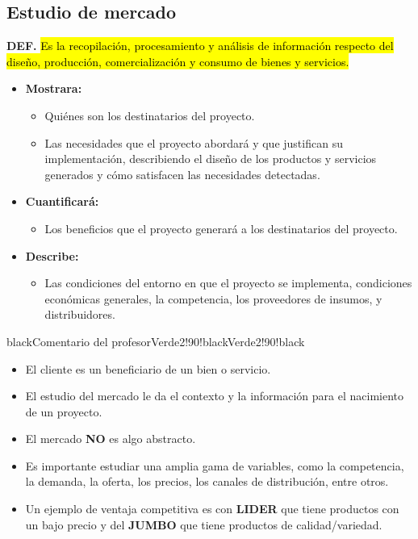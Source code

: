 \documentclass{templateNote}
\newcommand{\hlcolor}[2]{{\sethlcolor{#1}\hl{#2}}}
\begin{document}
\subsection{Estudio de mercado}\hypertarget{EM}{}
\textbf{DEF.} \hlcolor{Amarillo!50}{Es la recopilación, procesamiento y análisis de información respecto del diseño, producción, comercialización y consumo de bienes y servicios.}
\begin{itemize}
  \item \textbf{Mostrara:}
  \begin{itemize}
    \item Quiénes son los destinatarios del proyecto.
    \item Las necesidades que el proyecto abordará y que justifican su implementación, describiendo el diseño de los productos y servicios generados y cómo satisfacen las necesidades detectadas.
  \end{itemize}
  \item  \textbf{Cuantificará:}
  \begin{itemize}
    \item Los beneficios que el proyecto generará a los destinatarios del proyecto.
  \end{itemize}
  \item \textbf{Describe:}
  \begin{itemize}
    \item Las condiciones del entorno en que el proyecto se implementa, condiciones económicas generales, la competencia, los proveedores de insumos, y distribuidores.
  \end{itemize}
\end{itemize}

\begin{CuadroPersonalizado}{black}{Comentario del profesor}{Verde2!90!black}{Verde2!90!black}
  \begin{itemize}
    \item El cliente es un beneficiario de un bien o servicio.
    \item El estudio del mercado le da el contexto y la información para el nacimiento de un proyecto.
    \item El mercado \textbf{NO} es algo abstracto.
    \item Es importante estudiar una amplia gama de variables, como la competencia, la demanda, la oferta, los precios, los canales de distribución, entre otros.
    \item Un ejemplo de ventaja competitiva es con \textbf{LIDER} que tiene productos con un bajo precio y del \textbf{JUMBO} que tiene productos de calidad/variedad.
  \end{itemize}
\end{CuadroPersonalizado}
\end{document}
